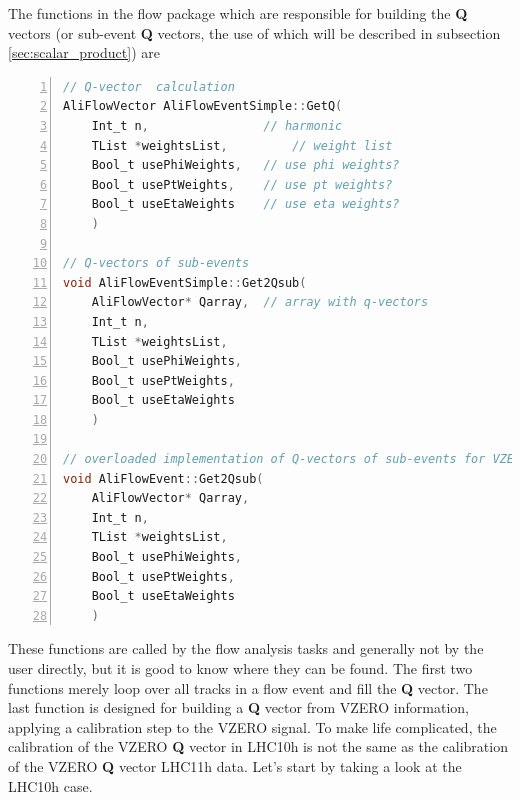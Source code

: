 \documentclass[a4paper]{book}
\numberwithin{equation}{subsection}
\begin{document}
The functions in the flow package which are responsible for building the \textbf{Q} vectors (or sub-event \textbf{Q} vectors, the use of which will be described in subsection \ref{sec:scalar_product}) are
\begin{lstlisting}[language=C, numbers=left]
// Q-vector  calculation
AliFlowVector AliFlowEventSimple::GetQ( 
	Int_t n, 				// harmonic
    TList *weightsList, 		// weight list
    Bool_t usePhiWeights, 	// use phi weights?
    Bool_t usePtWeights, 	// use pt weights?
    Bool_t useEtaWeights 	// use eta weights?
    )

// Q-vectors of sub-events
void AliFlowEventSimple::Get2Qsub( 
	AliFlowVector* Qarray, 	// array with q-vectors
    Int_t n, 
    TList *weightsList, 
    Bool_t usePhiWeights, 
    Bool_t usePtWeights, 
    Bool_t useEtaWeights 
    )

// overloaded implementation of Q-vectors of sub-events for VZERO information
void AliFlowEvent::Get2Qsub(
	AliFlowVector* Qarray, 
	Int_t n, 
	TList *weightsList, 
	Bool_t usePhiWeights, 
	Bool_t usePtWeights, 
	Bool_t useEtaWeights
	)\end{lstlisting}
These functions are called by the flow analysis tasks and generally not by the user directly, but it is good to know where they can be found. The first two functions merely loop over all tracks in a flow event and fill the \textbf{Q} vector. The last function is designed for building a \textbf{Q} vector from VZERO information, applying a calibration step to the VZERO signal. To make life complicated, the calibration of the VZERO \textbf{Q} vector in LHC10h is not the same as the calibration of the VZERO \textbf{Q} vector LHC11h data. Let's start by taking a look at the LHC10h case. 
\end{document}
